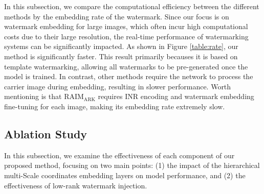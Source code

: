 \documentclass{article}
\begin{document}
\begin{table}[]
    \centering
    
\renewcommand\arraystretch{1.2}
\caption{Embedding rates for different methods.Where the second row represents whether the embedding is done using only the CPU or not, and the third row represents the average watermark embedding rate for a single image with a resolution of 2K. We use AMD Ryzen 7 7840HS for our CPU and NVIDIA RTX 3090 for our GPU for testing.}
\label{table:rate}
\end{table}

In this subsection, we compare the computational efficiency between the different methods by the embedding rate of the watermark.
Since our focus is on watermark embedding for large images, which often incur high computational costs due to their large resolution, the real-time performance of watermarking systems can be significantly impacted. As shown in Figure \ref{table:rate}, our method is significantly faster. This result primarily becauses it is based on template watermarking, allowing all watermarks to be pre-generated once the model is trained. In contrast, other methods require the network to process the carrier image during embedding, resulting in slower performance.
Worth mentioning is that RAIM$_{\mathrm{ARK}}$ requires INR encoding and watermark embedding fine-tuning for each image, making its embedding rate extremely slow.

\subsection{Ablation Study}
In this subsection, we examine the effectiveness of each component of our proposed method, focusing on two main points: (1) the impact of the hierarchical multi-Scale coordinates embedding layers on model performance, and (2) the effectiveness of low-rank watermark injection.
\end{document}
